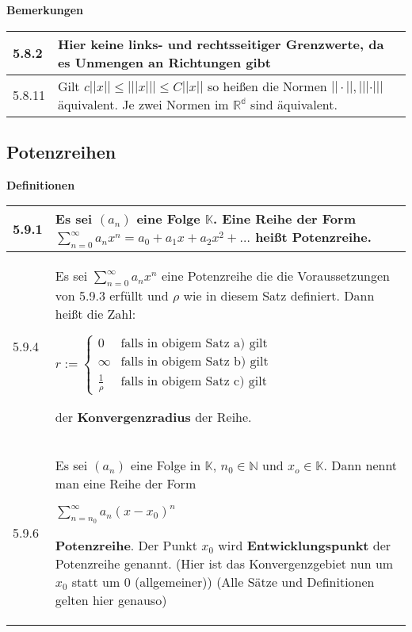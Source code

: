     \noindent
    \textbf{Bemerkungen}
    \begin{table}[H]
    \begin{tabularx}{\textwidth}{X m{16cm}}
        \toprule

        5.8.2 & Hier keine links- und rechtsseitiger Grenzwerte, da es Unmengen an Richtungen gibt \\
        \midrule
        5.8.11& Gilt $c||x|| \leq |||x||| \leq C||x||$ so hei\ss en die Normen $||\cdot||,|||\cdot|||$ äquivalent. \hfill \break
                Je zwei Normen im $\mathbb{R^d}$ sind äquivalent. \\

        \bottomrule
    \end{tabularx}
    \end{table}

\subsection{Potenzreihen}
    \noindent
    \textbf{Definitionen}
    \begin{table}[H]  
    \begin{tabularx}{\textwidth}{X m{16cm}}
        \toprule

        5.9.1 & Es sei $(a_n)$ eine Folge $\mathbb{K}$. Eine Reihe der Form $\sum^{\infty}_{n=0} a_n x^n = a_0 + a_1x+a_2x^2+ \dots$ 
                heißt \textbf{Potenzreihe}. \\
        \midrule
        5.9.4 & Es sei $\sum^{\infty}_{n=0} a_nx^n$ eine Potenzreihe die die Voraussetzungen von 5.9.3 erfüllt und $\rho$ wie in diesem Satz 
                definiert. Dann heißt die Zahl: \hfill \break
                \centerline{$r:=    \begin{cases}
                                    0 & \text{falls in obigem Satz a) gilt} \\
                                    \infty & \text{falls in obigem Satz b) gilt} \\
                                    \frac{1}{\rho} & \text{falls in obigem Satz c) gilt}
                                    \end{cases}$ }
                der \textbf{Konvergenzradius} der Reihe. \\
        \midrule
        5.9.6 & Es sei $(a_n)$ eine Folge in $\mathbb{K}$, $n_0 \in \mathbb{N}$ und $x_o \in \mathbb{K}$. Dann nennt man eine Reihe der Form \hfill \break
                \centerline{$\sum^{\infty}_{n=n_0}a_n(x-x_0)^n$}
                \textbf{Potenzreihe}. Der Punkt $x_0$ wird \textbf{Entwicklungspunkt} der Potenzreihe genannt. \hfill \break
                (Hier ist das Konvergenzgebiet nun um $x_0$ statt um 0 (allgemeiner)) \hfill \break
                (Alle Sätze und Definitionen gelten hier genauso) \\

        \bottomrule

    \end{tabularx}
    \end{table}

